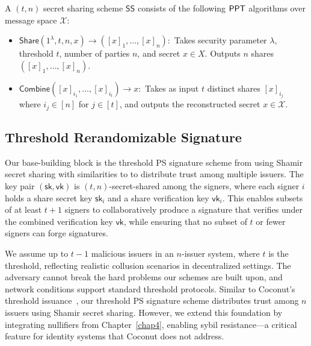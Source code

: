 \begin{definition}
A $(t,n)$ secret sharing scheme $\mathsf{SS}$ consists of the following $\mathsf{PPT}$ algorithms over message space $\mathcal{X}$:
\begin{itemize}
    \item $\mathsf{Share}(1^{\lambda}, t, n, x) \to ([x]_1, \dots, [x]_n):$ Takes security parameter $\lambda$, threshold $t$, number of parties $n$, and secret $x \in X$. Outputs $n$ shares $([x]_1, \dots, [x]_n)$.
    
    \item $\mathsf{Combine}([x]_{i_1}, \dots, [x]_{i_t}) \to x:$ Takes as input $t$ distinct shares $[x]_{i_j}$ where $i_j \in [n]$ for $j \in [t]$, and outputs the reconstructed secret $x \in \mathcal{X}$.
\end{itemize}
\end{definition}




\subsection{Threshold Rerandomizable Signature}

Our base-building block is the threshold PS signature scheme from \cite{tomescu_utt_2022} using Shamir secret sharing with similarities to \cite{sonnino_coconut_2020} to distribute trust among multiple issuers. The key pair $(\mathsf{sk}, \mathsf{vk})$ is $(t,n)$-secret-shared among the signers, where each signer $i$ holds a share secret key $\mathsf{sk}_i$ and a share verification key $\mathsf{vk}_i$. This enables subsets of at least $t+1$ signers to collaboratively produce a signature that verifies under the combined verification key $\mathsf{vk}$, while ensuring that no subset of $t$ or fewer signers can forge signatures.

We assume up to $t-1$ malicious issuers in an $n$-issuer system, where $t$ is the threshold, reflecting realistic collusion scenarios in decentralized settings. The adversary cannot break the hard problems our schemes are built upon, and network conditions support standard threshold protocols. Similar to Coconut’s threshold issuance~\cite{sonnino_coconut_2020}, our threshold PS signature scheme distributes trust among $n$ issuers using Shamir secret sharing. However, we extend this foundation by integrating nullifiers from Chapter~\ref{chap4}, enabling sybil resistance—a critical feature for identity systems that Coconut does not address.

